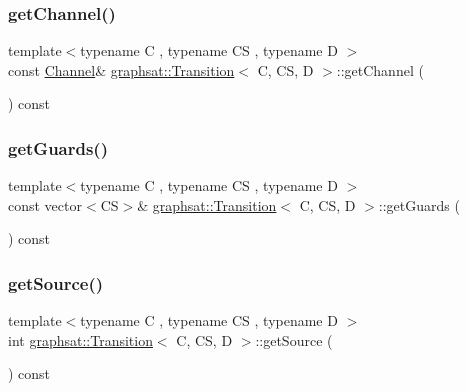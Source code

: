 \subsubsection{\texorpdfstring{getChannel()}{getChannel()}}
{\footnotesize\ttfamily template$<$typename C , typename CS , typename D $>$ \\
const \mbox{\hyperlink{structgraphsat_1_1_channel}{Channel}}\& \mbox{\hyperlink{classgraphsat_1_1_transition}{graphsat\+::\+Transition}}$<$ C, CS, D $>$\+::get\+Channel (\begin{DoxyParamCaption}{ }\end{DoxyParamCaption}) const\hspace{0.3cm}{\ttfamily [inline]}}

\mbox{\label{classgraphsat_1_1_transition_a0dd4175fcf8cae99fbac4b00aa5cc9d1}} 
\subsubsection{\texorpdfstring{getGuards()}{getGuards()}}
{\footnotesize\ttfamily template$<$typename C , typename CS , typename D $>$ \\
const vector$<$CS$>$\& \mbox{\hyperlink{classgraphsat_1_1_transition}{graphsat\+::\+Transition}}$<$ C, CS, D $>$\+::get\+Guards (\begin{DoxyParamCaption}{ }\end{DoxyParamCaption}) const\hspace{0.3cm}{\ttfamily [inline]}}

\mbox{\label{classgraphsat_1_1_transition_ac6db9fd2e60156e536f48bef36973875}} 
\subsubsection{\texorpdfstring{getSource()}{getSource()}}
{\footnotesize\ttfamily template$<$typename C , typename CS , typename D $>$ \\
int \mbox{\hyperlink{classgraphsat_1_1_transition}{graphsat\+::\+Transition}}$<$ C, CS, D $>$\+::get\+Source (\begin{DoxyParamCaption}{ }\end{DoxyParamCaption}) const\hspace{0.3cm}{\ttfamily [inline]}}

